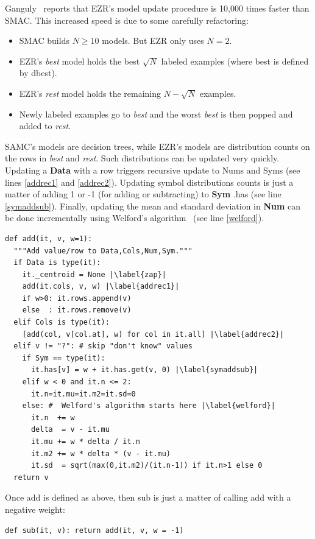 \documentclass[AMA,STIX2COL]{WileyNJDv5}
\newcommand{\cls}[1]{%
  \setlength{\fboxsep}{1.5pt}%
  \colorbox{clsbg}{\sffamily\bfseries{#1}}%
}
\begin{document}
 Ganguly~\cite{ganguly2026lowgodatalightse} reports that EZR's model update procedure   is 10,000 times faster than SMAC. This increased speed is due to some carefully 
  refactoring:
 \begin{itemize}
\item  SMAC builds $N\ge10$ models. But EZR only uses $N=2$.
\item
EZR's {\em best} model holds the best  $\sqrt{N}$ labeled examples
(where best is defined by \textsf{dbest}).
\item
EZR's {\em rest} model holds the  remaining $N-\sqrt{N}$ examples.
\item
Newly labeled examples go to {\em best} and the worst {\em best}
is then popped and  added to {\em rest}.
\end{itemize}
SAMC's models are decision trees, while EZR's models are   distribution counts on the rows in {\em best} and {\em rest}. 
Such distributions can be updated very quickly.
  Updating a \cls{Data} with a row triggers recursive update
  to   \textsf{Num}s and \textsf{Sym}s (see lines \ref{addrec1} and \ref{addrec2}).
Updating   symbol distributions counts is just a matter of adding 1 or -1 (for adding or subtracting) to \cls{Sym}.\textsf{has} (see line \ref{symaddsub}). 
Finally, updating the mean and standard deviation in \cls{Num} can be done
incrementally using Welford's algorithm~\cite{Knuth1998TAOCP2} (see line \ref{welford}).  
\begin{verbatim}
def add(it, v, w=1):
  """Add value/row to Data,Cols,Num,Sym."""
  if Data is type(it):
    it._centroid = None |\label{zap}|
    add(it.cols, v, w) |\label{addrec1}| 
    if w>0: it.rows.append(v)
    else  : it.rows.remove(v)
  elif Cols is type(it):
    [add(col, v[col.at], w) for col in it.all] |\label{addrec2}| 
  elif v != "?": # skip "don't know" values
    if Sym == type(it):
      it.has[v] = w + it.has.get(v, 0) |\label{symaddsub}|
    elif w < 0 and it.n <= 2:
      it.n=it.mu=it.m2=it.sd=0
    else: #  Welford's algorithm starts here |\label{welford}|
      it.n  += w   
      delta  = v - it.mu
      it.mu += w * delta / it.n
      it.m2 += w * delta * (v - it.mu)
      it.sd  = sqrt(max(0,it.m2)/(it.n-1)) if it.n>1 else 0
  return v
\end{verbatim}
Once \textsf{add} is defined as above, then \textsf{sub} is just a matter of calling
\textsf{add}   with a negative weight:
\begin{verbatim}
def sub(it, v): return add(it, v, w = -1)
\end{verbatim}
\end{document}
